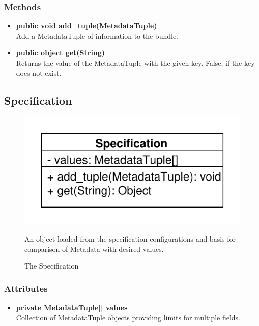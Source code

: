 \subsubsection{Methods}
\begin{itemize}
	\item \textbf{public void add\_tuple(MetadataTuple)}\\
	Add a MetadataTuple of information to the bundle.
	\item \textbf{public object get(String)}\\
	Returns the value of the MetadataTuple with the given key. False, if the key does not exist.
\end{itemize}


\subsection{Specification}
\begin{figure}[htbp]
	\begin{minipage}[t]{7cm}
		\vspace{0pt}
		\centering
		\includegraphics[scale=0.6]{./diagram_pictures/Specification.pdf}
		\caption{The Specification}
	\end{minipage}
	\hfill
	\begin{minipage}[t]{8cm}
		\vspace{10pt}
		An object loaded from the specification configurations and basis for comparison of Metadata with desired values.
	\end{minipage}
\end{figure}

\subsubsection{Attributes}
\begin{itemize}
	\item \textbf{private MetadataTuple[] values}\\
	Collection of MetadataTuple objects providing limits for multiple fields.
\end{itemize}
